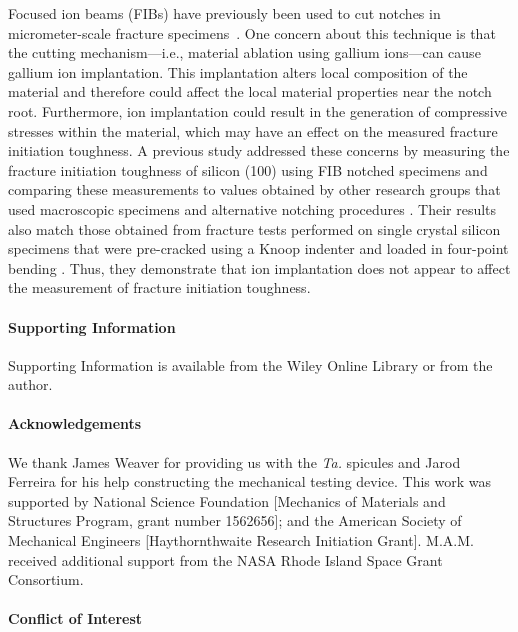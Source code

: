 \documentclass[12pt,onecolumn]{article}
\makeatletter
\newcommand{\TA}{\textit{Ta.\@}\xspace}
\makeatother
\begin{document}
\begin{bibunit}
Focused ion beams (FIBs) have previously been used to cut notches in micrometer-scale fracture specimens~\cite{jaya2015can,fett2008fracture,ochiai2014fracture,morishita2006fracture}.  One concern about this technique is that the cutting mechanism---i.e., material ablation using gallium ions---can cause gallium ion implantation. This implantation alters local composition of the material and therefore could affect the local material properties near the notch root. Furthermore, ion implantation could result in the generation of compressive stresses within the material, which may have an effect on the measured fracture initiation toughness. A previous study \cite{jaya2015can} addressed these concerns by measuring the fracture initiation toughness of silicon (100) using FIB notched specimens and comparing these measurements to values obtained by other research groups that used macroscopic specimens and alternative notching procedures \cite{ritchie2003failure}. Their results also match those obtained from fracture tests performed on single crystal silicon specimens that were pre-cracked using a Knoop indenter and loaded in four-point bending \cite{chen1980fracture}. Thus, they demonstrate that ion implantation does not appear to affect the measurement of fracture initiation toughness.

\singlespacing
\paragraph{Supporting Information} \hfill

Supporting Information is available from the Wiley Online Library or from the author.

\paragraph{Acknowledgements} \hfill 

We thank James Weaver for providing us with the \TA spicules and Jarod Ferreira for his help constructing the mechanical testing device. This work was supported by National Science Foundation [Mechanics of Materials and Structures Program, grant number 1562656]; and the American Society of Mechanical Engineers [Haythornthwaite Research Initiation Grant]. M.A.M. received additional support from the NASA Rhode Island Space Grant Consortium.

\paragraph{Conflict of Interest} \hfill 


\end{bibunit}
\end{document}
